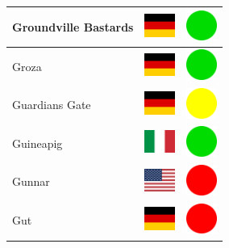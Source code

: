 \documentclass[12pt, a4paper, twoside]{report}
\begin{document}
\begin{center}
\begin{longtable}{|p{5cm}|p{2cm}|p{2cm}|}
 Groundville Bastards                                       & \includegraphics[width=1cm]{4x3/de} &   \includegraphics[width=1cm]{likes/y} \\ \hline
 Groza                                                      & \includegraphics[width=1cm]{4x3/de} &   \includegraphics[width=1cm]{likes/y} \\ \hline
 Guardians Gate                                             & \includegraphics[width=1cm]{4x3/de} &   \includegraphics[width=1cm]{likes/m} \\ \hline
 Guineapig                                                  & \includegraphics[width=1cm]{4x3/it} &   \includegraphics[width=1cm]{likes/y} \\ \hline
 Gunnar                                                     & \includegraphics[width=1cm]{4x3/us} &   \includegraphics[width=1cm]{likes/n} \\ \hline
 Gut                                                        & \includegraphics[width=1cm]{4x3/de} &   \includegraphics[width=1cm]{likes/n} \\ \hline

\end{longtable}
\end{center}
\end{document}
